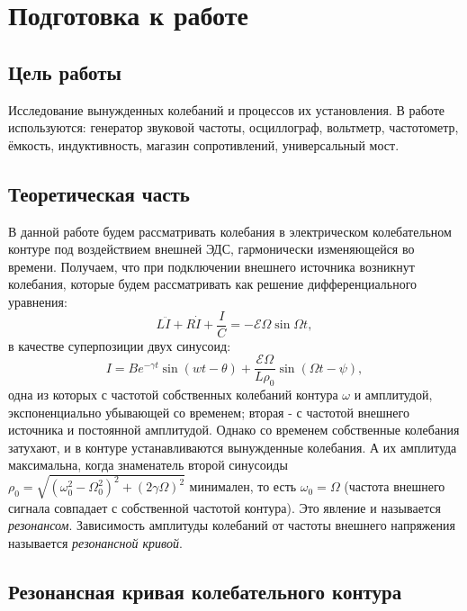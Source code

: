 \documentclass{lab}
\begin{document}


\section*{Подготовка к работе}

\subsection*{Цель работы}

Исследование вынужденных колебаний и процессов их установления.
В работе используются: генератор звуковой частоты, осциллограф, вольтметр, частотометр, ёмкость, индуктивность, магазин сопротивлений, универсальный мост.

\subsection*{Теоретическая часть}

В данной работе будем рассматривать колебания в электрическом колебательном контуре под воздействием внешней ЭДС, гармонически изменяющейся во времени. 
Получаем, что при подключении внешнего источника возникнут колебания, которые будем рассматривать как решение дифференциального уравнения:
\begin{equation}
L\ddot{I} + R \dot{I} + \dfrac{I}{C} = - \mathscr{E} \Omega \sin \Omega t,
\end{equation}
в качестве суперпозиции двух синусоид:
\begin{equation}
I = Be^{-\gamma t} \sin (wt-\theta) + \dfrac{\mathscr{E} \Omega}{L \rho_0} \sin (\Omega t - \psi),
\end{equation}
одна из которых с частотой собственных колебаний контура $\omega$ и амплитудой, экспоненциально убывающей со временем; вторая - с частотой внешнего источника и постоянной амплитудой. Однако со временем собственные колебания затухают, и в контуре устанавливаются вынужденные колебания. А их амплитуда максимальна, когда знаменатель второй синусоиды $\rho_0 = \sqrt{(\omega_0^2 - \Omega^2_0)^2 + (2\gamma \Omega)^2}$ минимален, то есть $\omega_0 = \Omega$ (частота внешнего сигнала совпадает с собственной частотой контура). Это явление и называется \textit{резонансом}. Зависимость амплитуды колебаний от частоты внешнего напряжения называется \textit{резонансной кривой}.

\subsection*{Резонансная кривая колебательного контура}
\end{document}
